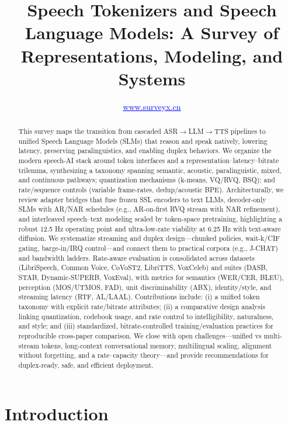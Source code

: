 \documentclass{article}
\title{Speech Tokenizers and Speech Language Models: A Survey of Representations, Modeling, and Systems}
\author{\href{http://www.surveyx.cn}{\textcolor{blue}{\underline{www.surveyx.cn}}}}
\begin{document}
\maketitle

 

\begin{abstract}
This survey maps the transition from cascaded ASR$\rightarrow$LLM$\rightarrow$TTS pipelines to unified Speech Language Models (SLMs) that reason and speak natively, lowering latency, preserving paralinguistics, and enabling duplex behaviors. We organize the modern speech-AI stack around token interfaces and a representation--latency--bitrate trilemma, synthesizing a taxonomy spanning semantic, acoustic, paralinguistic, mixed, and continuous pathways; quantization mechanisms (k-means, VQ/RVQ, BSQ); and rate/sequence controls (variable frame-rates, dedup/acoustic BPE). Architecturally, we review adapter bridges that fuse frozen SSL encoders to text LLMs, decoder-only SLMs with AR/NAR schedules (e.g., AR-on-first RVQ stream with NAR refinement), and interleaved speech--text modeling scaled by token-space pretraining, highlighting a robust 12.5 Hz operating point and ultra-low-rate viability at 6.25 Hz with text-aware diffusion. We systematize streaming and duplex design---chunked policies, wait-k/CIF gating, barge-in/IRQ control---and connect them to practical corpora (e.g., J-CHAT) and bandwidth ladders. Rate-aware evaluation is consolidated across datasets (LibriSpeech, Common Voice, CoVoST2, LibriTTS, VoxCeleb) and suites (DASB, STAB, Dynamic-SUPERB, VoxEval), with metrics for semantics (WER/CER, BLEU), perception (MOS/UTMOS, FAD), unit discriminability (ABX), identity/style, and streaming latency (RTF, AL/LAAL). Contributions include: (i) a unified token taxonomy with explicit rate/bitrate attributes; (ii) a comparative design analysis linking quantization, codebook usage, and rate control to intelligibility, naturalness, and style; and (iii) standardized, bitrate-controlled training/evaluation practices for reproducible cross-paper comparison. We close with open challenges---unified vs multi-stream tokens, long-context conversational memory, multilingual scaling, alignment without forgetting, and a rate--capacity theory---and provide recommendations for duplex-ready, safe, and efficient deployment.
\end{abstract}


\section{Introduction} \label{sec:Introduction}
\end{document}

